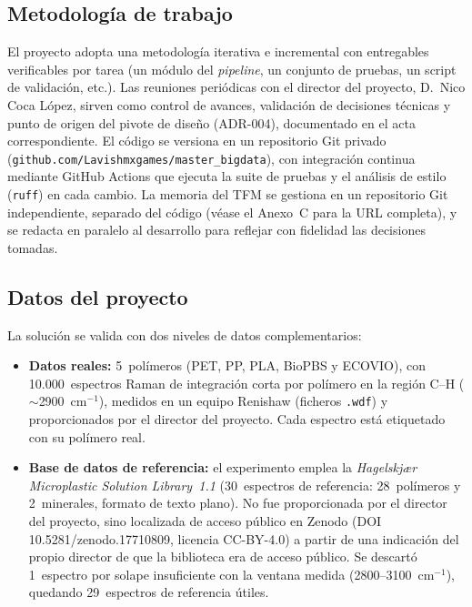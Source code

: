 \subsection{Metodología de trabajo}

El proyecto adopta una metodología iterativa e incremental con entregables verificables por tarea (un módulo del \textit{pipeline}, un conjunto de pruebas, un script de validación, etc.). Las reuniones periódicas con el director del proyecto, D.~Nico Coca López, sirven como control de avances, validación de decisiones técnicas y punto de origen del pivote de diseño (ADR-004), documentado en el acta correspondiente. El código se versiona en un repositorio Git privado (\texttt{github.com/Lavishmxgames/master\_bigdata}), con integración continua mediante GitHub Actions que ejecuta la suite de pruebas y el análisis de estilo (\texttt{ruff}) en cada cambio. La memoria del TFM se gestiona en un repositorio Git independiente, separado del código (véase el Anexo~C para la URL completa), y se redacta en paralelo al desarrollo para reflejar con fidelidad las decisiones tomadas.

\subsection{Datos del proyecto}

La solución se valida con dos niveles de datos complementarios:

\begin{itemize}
    \item \textbf{Datos reales:} 5~polímeros (PET, PP, PLA, BioPBS y ECOVIO), con 10.000~espectros Raman de integración corta por polímero en la región C--H ($\sim$2900~cm$^{-1}$), medidos en un equipo Renishaw (ficheros \texttt{.wdf}) y proporcionados por el director del proyecto. Cada espectro está etiquetado con su polímero real.
    \item \textbf{Base de datos de referencia:} el experimento emplea la \emph{Hagelskjær Microplastic Solution Library~1.1} \citep{hagelskjaer2025library} (30~espectros de referencia: 28~polímeros y 2~minerales, formato de texto plano). No fue proporcionada por el director del proyecto, sino localizada de acceso público en Zenodo (DOI 10.5281/zenodo.17710809, licencia CC-BY-4.0) a partir de una indicación del propio director de que la biblioteca era de acceso público. Se descartó 1~espectro por solape insuficiente con la ventana medida (2800--3100~cm$^{-1}$), quedando 29~espectros de referencia útiles.
\end{itemize}

